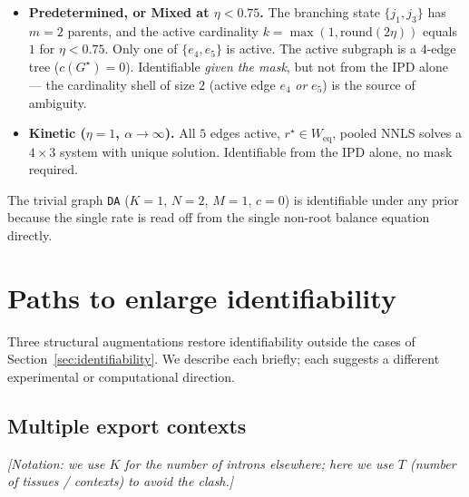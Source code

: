 \documentclass[11pt, a4paper]{article}
\newcommand{\note}[1]{\textcolor{red!70!black}{\textit{[#1]}}}
\newcommand{\rstar}{r^{\star}}
\newcommand{\Gstar}{G^{\star}}
\begin{document}
\begin{itemize}[leftmargin=*, itemsep=2pt, topsep=2pt]
  \item \textbf{Predetermined, or Mixed at $\eta < 0.75$.} The branching state $\{j_1, j_3\}$ has $m = 2$ parents, and the active cardinality $k = \max(1, \mathrm{round}(2\eta))$ equals $1$ for $\eta < 0.75$. Only one of $\{e_4, e_5\}$ is active. The active subgraph is a $4$-edge tree ($c(\Gstar) = 0$). Identifiable \emph{given the mask}, but not from the IPD alone --- the cardinality shell of size $2$ (active edge $e_4$ \emph{or} $e_5$) is the source of ambiguity.

  \item \textbf{Kinetic ($\eta = 1$, $\alpha \to \infty$).} All $5$ edges active, $\rstar \in W_{\mathrm{eq}}$, pooled NNLS solves a $4 \times 3$ system with unique solution. Identifiable from the IPD alone, no mask required.
\end{itemize}

The trivial graph \texttt{DA} ($K = 1$, $N = 2$, $M = 1$, $c = 0$) is identifiable under any prior because the single rate is read off from the single non-root balance equation directly.

\section{Paths to enlarge identifiability}
\label{sec:paths}

Three structural augmentations restore identifiability outside the cases of Section~\ref{sec:identifiability}. We describe each briefly; each suggests a different experimental or computational direction.

\subsection{Multiple export contexts}

\note{Notation: we use $K$ for the number of introns elsewhere; here we use $T$ (number of tissues / contexts) to avoid the clash.}
\end{document}
